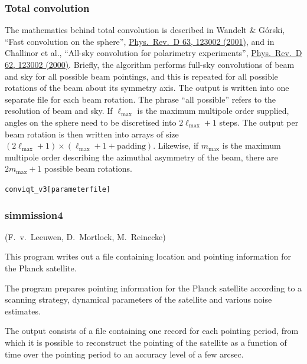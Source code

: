 \subsubsection {Total convolution}
The mathematics behind total convolution is described in Wandelt \&
G\'orski, ``Fast convolution on the sphere'', \href{http://ojps.aip.org/getpdf/servlet/GetPDFServlet?filetype=pdf&id=PRVDAQ000063000012123002000001&idtype=cvips}{Phys.~Rev.~D
  63, 123002 (2001)}, and in Challinor et al., ``All-sky convolution for
polarimetry experiments'', \href{http://ojps.aip.org/getpdf/servlet/GetPDFServlet?filetype=pdf&id=PRVDAQ000062000012123002000001&idtype=cvips}{Phys.~Rev.~D
  62, 123002 (2000)}. Briefly, the
algorithm performs full-sky convolutions of beam and sky for all
possible beam pointings, and this is repeated for all possible
rotations of the beam about its symmetry axis. The output is written
into one separate file for each beam rotation. The phrase ``all
possible'' refers to the resolution of beam and sky. If
$\ell_\mathrm{max}$ is the maximum multipole order supplied, angles on
the sphere need to be discretised into $2\ell_\mathrm{max}+1$
steps. The output per beam rotation is then written into arrays of size
$(2\ell_\mathrm{max}+1)\times(\ell_\mathrm{max}+1+\mbox{padding})$.
Likewise, if
$m_\mathrm{max}$ is the maximum multipole order describing the
azimuthal asymmetry of the beam, there are $2m_\mathrm{max}+1$
possible beam rotations.

\begin{alltt}
conviqt_v3 [parameter file]


\end{alltt}

\subsubsection{simmission4}
(F.~v.~Leeuwen, D.~Mortlock, M.~Reinecke)
\label{simmission4}

    This program writes out a file containing location and pointing information
    for the Planck satellite.

    The program prepares pointing information for the Planck satellite according
    to a scanning strategy, dynamical parameters of the satellite and various
    noise estimates.

    The output consists of a file containing one record for each pointing
    period, from which it is possible to reconstruct the pointing
    of the satellite as a function of time over the pointing period to
    an accuracy level of a few arcsec.

